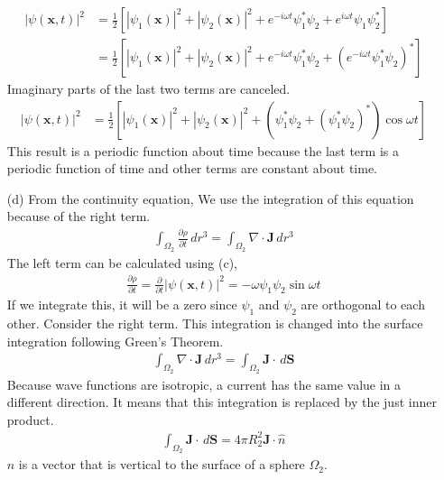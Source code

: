 \documentclass[aps,floatfix,nofootinbib,superscriptaddress,fleqn]{revtex4}
\begin{document}
\begin{itemize}
      \begin{align}
      |\psi(\bm{x},t)|^2 &= \frac{1}{2}\left[|\psi_1(\bm{x})|^2 + |\psi_2(\bm{x})|^2+e^{-i\omega t}\psi_1^*\psi_2+e^{i\omega t}\psi_1\psi_2^*  \right]
  \\                     &= \frac{1}{2}\left[ |\psi_1(\bm{x})|^2 + |\psi_2(\bm{x})|^2 + e^{-i\omega t}\psi_1^*\psi_2 + {\left(e^{-i\omega t}\psi_1^*\psi_2\right)}^* \right]
\end{align}
Imaginary parts of the last two terms are canceled.
\begin{align}  
  |\psi(\bm{x},t)|^2 &= \frac{1}{2}\left[ |\psi_1(\bm{x})|^2 + |\psi_2(\bm{x})|^2 + \left(\psi_1^*\psi_2 + {\left(\psi_1^*\psi_2\right)}^*\right)\cos{\omega t} \right]
\end{align}
This result is a periodic function about time because the last term is a periodic function of time and other terms are constant about time.
    \item[(d)]
From the continuity equation, We use the integration of this equation because of the right term.
\begin{align}
  \int_{\Omega_2}\frac{\partial \rho}{\partial t}\,dr^3 = \int_{\Omega_2}\nabla \cdot \bm{J}\,dr^3
\end{align}
The left term can be calculated using (c),
\begin{align}
  \frac{\partial\rho}{\partial t} = \frac{\partial}{\partial t}|\psi(\bm{x},t)|^2 = -\omega \psi_1\psi_2\sin\omega t
\end{align}
If we integrate this, it will be a zero since $\psi_1$ and $\psi_2$ are orthogonal to each other. Consider the right term. This integration is changed into the surface integration following Green's Theorem.
\begin{align}
  \int_{\Omega_2}\nabla \cdot \bm{J}\,dr^3 = \int_{\Omega_2} \bm{J} \cdot\,d\bm{S}
\end{align}
Because wave functions are isotropic, a current has the same value in a different direction. It means that this integration is replaced by the just inner product.
\begin{align}
  \int_{\Omega_2} \bm{J} \cdot\,d\bm{S} = 4\pi R_2^2\bm{J}\cdot\hat{n}
\end{align}
$\hat{n}$ is a vector that is vertical to the surface of a sphere $\Omega_2$.
  \end{itemize}
\end{document}
